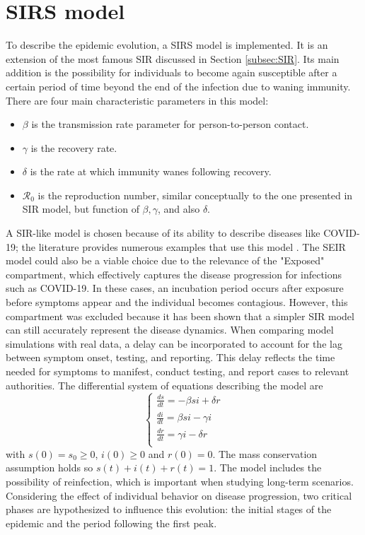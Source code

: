\section{SIRS model}
\label{sec:SIRS}
To describe the epidemic evolution, a  SIRS model is implemented. It is an extension of the most famous SIR discussed in Section \ref{subsec:SIR}. Its main addition is the possibility for individuals to become again susceptible after a certain period of time beyond the end of the infection due to waning immunity. There are four main characteristic parameters in this model:
\begin{itemize}
	\item $\beta$ is the transmission rate parameter for person-to-person
	contact.
	\item $\gamma$ is the recovery rate.
	\item  $\delta$ is the rate at which immunity wanes following recovery.
	\item  $\mathcal{R}_0$ is the reproduction number, similar conceptually to the one presented in SIR model, but function of $\beta, \gamma$, and also $\delta$. 
\end{itemize}
A SIR-like model is chosen because of its ability to describe diseases like COVID-19; the literature provides numerous examples that use this model \cite{Dehning_2020, Li2022}. The SEIR model could also be a viable choice due to the relevance of the "Exposed" compartment, which effectively captures the disease progression for infections such as COVID-19. In these cases, an incubation period occurs after exposure before symptoms appear and the individual becomes contagious. However, this compartment was excluded because it has been shown \cite{Dehning_2020} that a simpler SIR model can still accurately represent the disease dynamics. When comparing model simulations with real data, a delay can be incorporated to account for the lag between symptom onset, testing, and reporting. This delay reflects the time needed for symptoms to manifest, conduct testing, and report cases to relevant authorities.
The differential system of equations describing the model are
\begin{equation}
	\label{eq:SIRS_eq}
	\begin{cases}
		\frac{ds}{dt} = -\beta s i + \delta r \\
		\frac{di}{dt} = \beta s i -  \gamma i \\
		\frac{dr}{dt}= \gamma i -  \delta r\\
	\end{cases}
\end{equation}
with $s(0) = s_0 \ge 0$, $i(0) \ge 0$ and $r(0) = 0$. The mass conservation assumption holds so $s(t)+i(t)+r(t) =1$.
The model includes the possibility of reinfection, which is important when studying long-term scenarios. Considering the effect of individual behavior on disease progression, two critical phases are hypothesized to influence this evolution: the initial stages of the epidemic and the period following the first peak.

